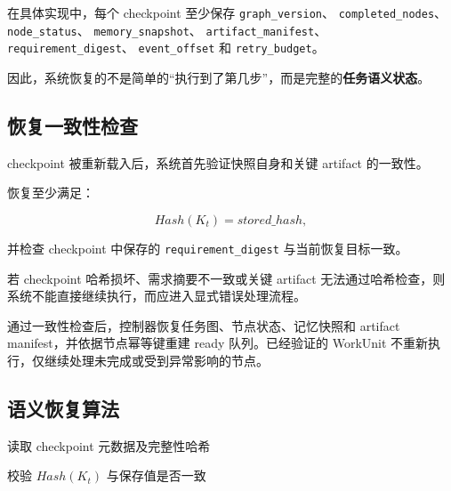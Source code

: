 \documentclass[UTF8,a4paper,12pt,oneside]{ctexbook}
\begin{document}
在具体实现中，每个 checkpoint 至少保存
\texttt{graph\_\allowbreak{}version}、
\texttt{completed\_\allowbreak{}nodes}、
\texttt{node\_\allowbreak{}status}、
\texttt{memory\_\allowbreak{}snapshot}、
\texttt{artifact\_\allowbreak{}manifest}、
\texttt{requirement\_\allowbreak{}digest}、
\texttt{event\_\allowbreak{}offset}
和
\texttt{retry\_\allowbreak{}budget}。

因此，系统恢复的不是简单的“执行到了第几步”，而是完整的\textbf{任务语义状态}。


\subsection{恢复一致性检查}

checkpoint 被重新载入后，系统首先验证快照自身和关键 artifact 的一致性。

恢复至少满足：

\[
Hash(K_t)=stored\_hash,
\]

并检查 checkpoint 中保存的
\texttt{requirement\_digest}
与当前恢复目标一致。

若 checkpoint 哈希损坏、需求摘要不一致或关键 artifact 无法通过哈希检查，则系统不能直接继续执行，而应进入显式错误处理流程。

通过一致性检查后，控制器恢复任务图、节点状态、记忆快照和 artifact manifest，并依据节点幂等键重建 ready 队列。已经验证的 WorkUnit 不重新执行，仅继续处理未完成或受到异常影响的节点。


\subsection{语义恢复算法}

\begin{algorithm}[H]
\caption{语义 Checkpoint 恢复与幂等重建}
\label{alg:semantic-checkpoint-recovery}

读取 checkpoint 元数据及完整性哈希\;

校验 $Hash(K_t)$ 与保存值是否一致\;

\end{algorithm}
\end{document}
